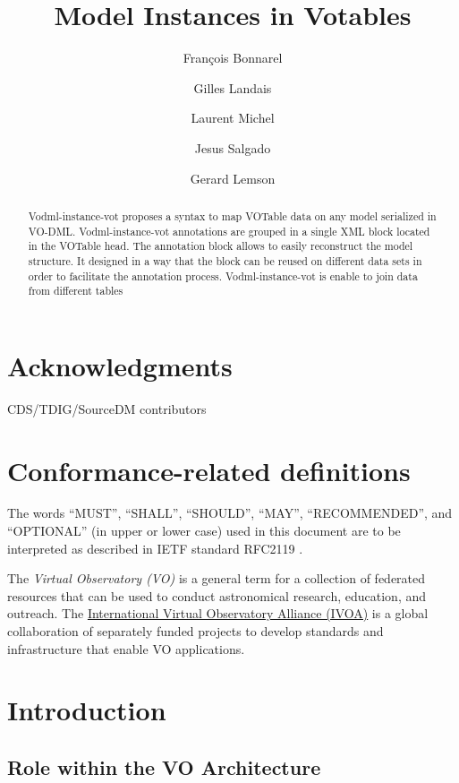 \documentclass[11pt,a4paper]{ivoa}
\title{Model Instances in Votables}
\author{François Bonnarel}
\author{Gilles Landais}
\author{Laurent Michel}
\author{Jesus Salgado}
\author{Gerard Lemson}
\begin{document}
\begin{abstract}
Vodml-instance-vot proposes a syntax to map VOTable data on any model serialized in VO-DML.
Vodml-instance-vot annotations are grouped in a single XML block located in the VOTable head. The annotation block allows to easily reconstruct the model structure. It designed in a way that the block can be reused on different data sets in order to facilitate the annotation process.
Vodml-instance-vot is enable to join data from different tables
\end{abstract}


\section*{Acknowledgments}
CDS/TDIG/SourceDM contributors

\section*{Conformance-related definitions}

The words ``MUST'', ``SHALL'', ``SHOULD'', ``MAY'', ``RECOMMENDED'', and
``OPTIONAL'' (in upper or lower case) used in this document are to be
interpreted as described in IETF standard RFC2119 \citep{std:RFC2119}.

The \emph{Virtual Observatory (VO)} is a
general term for a collection of federated resources that can be used
to conduct astronomical research, education, and outreach.
The \href{http://www.ivoa.net}{International
Virtual Observatory Alliance (IVOA)} is a global
collaboration of separately funded projects to develop standards and
infrastructure that enable VO applications.


\section{Introduction}



\lstset{language=XML}

\subsection{Role within the VO Architecture}
\end{document}
